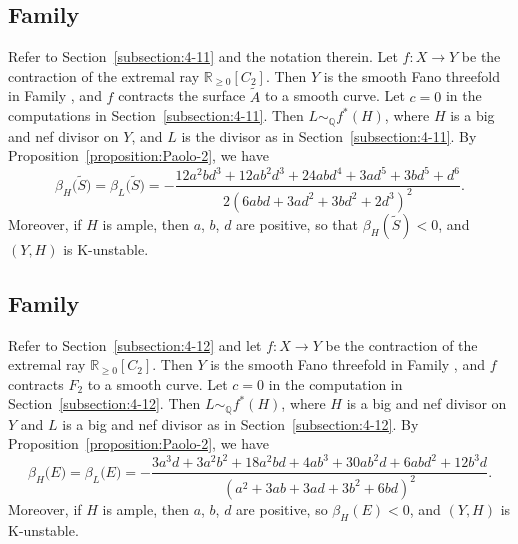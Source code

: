 \documentclass[12pt]{amsart}
\theoremstyle{definition}
\theoremstyle{remark}
\begin{document}
\subsection{Family }
\label{subsection:3-31}
Refer to Section~\ref{subsection:4-11} and the notation therein.
Let $f\colon X\to Y$ be the contraction of the extremal ray $\mathbb{R}_{\geqslant 0}[C_2]$.
Then $Y$ is the smooth Fano threefold in Family , and $f$ contracts the surface $\widetilde{A}$ to a smooth curve.
Let $c=0$ in the computations in Section~\ref{subsection:4-11}. Then $L\sim_{\mathbb{Q}} f^*(H)$,
where $H$ is a big and nef divisor on $Y$, and $L$ is the divisor as in Section~\ref{subsection:4-11}. By Proposition~\ref{proposition:Paolo-2}, we have
$$
\beta_H\big(\widetilde{S}\big)=\beta_L\big(\widetilde{S}\big)=-\frac{12a^2bd^3+12ab^2d^3+24abd^4+3ad^5+3bd^5+d^6}{2(6abd+3ad^2+3bd^2+2d^3)^2}.
$$
Moreover, if $H$ is ample, then $a$, $b$, $d$ are positive, so that $\beta_H(\widetilde{S})<0$, and $(Y,H)$ is K-unstable.

\subsection{Family }
\label{subsection:3-30}
Refer to Section~\ref{subsection:4-12} and let $f\colon X\to Y$ be the contraction of the extremal ray $\mathbb{R}_{\geqslant 0}[C_2]$.
Then $Y$ is the smooth Fano threefold in Family , and $f$ contracts $F_2$ to a smooth curve. Let $c=0$ in the computation in Section~\ref{subsection:4-12}. Then $L\sim_{\mathbb{Q}} f^*(H)$,
where $H$ is a big and nef divisor on $Y$ and $L$ is a big and nef  divisor as in Section~\ref{subsection:4-12}. By Proposition~\ref{proposition:Paolo-2}, we have
$$
\beta_H\big(E\big)=\beta_L\big(E\big)=-\frac{3a^3d+3a^2b^2+18a^2bd+4ab^3+30ab^2d+6abd^2+12b^3d}{(a^2+3ab+3ad+3b^2+6bd)^2}.
$$
Moreover, if $H$ is ample, then $a$, $b$, $d$ are positive, so $\beta_H(E)<0$, and $(Y,H)$ is K-unstable.
\end{document}
